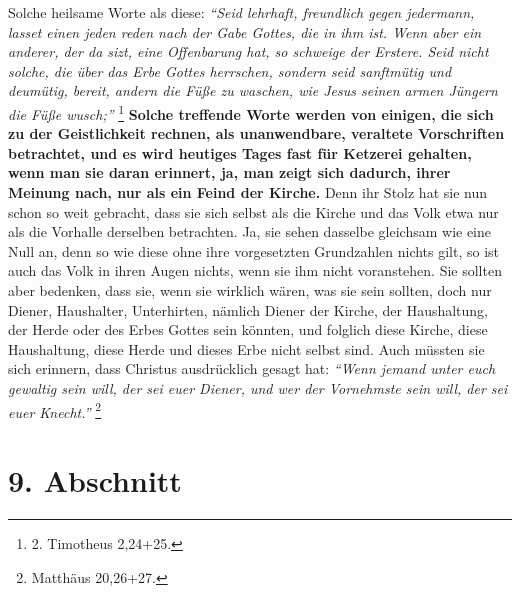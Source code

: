 Solche heilsame Worte als diese:
\textit{"`Seid lehrhaft, freundlich gegen jedermann,
lasset einen jeden reden nach der Gabe Gottes, die in ihm ist. Wenn aber ein
anderer, der da sizt, eine Offenbarung hat, so schweige der Erstere. Seid nicht
solche, die über das Erbe Gottes herrschen, sondern seid sanftmütig und
deumütig, bereit, andern die Füße zu waschen, wie Jesus seinen armen Jüngern die
Füße wusch;"'}
\footnote{2. Timotheus 2,24+25.}
\textbf{Solche treffende Worte werden von
einigen, die sich zu der Geistlichkeit rechnen, als
unanwendbare, veraltete
Vorschriften betrachtet, und es wird heutiges Tages fast für
Ketzerei gehalten,
wenn man sie daran erinnert, ja, man zeigt sich dadurch, ihrer Meinung nach, nur
als ein Feind der Kirche.} Denn ihr Stolz hat sie nun
schon so weit gebracht,
dass sie sich selbst als die Kirche und das Volk etwa nur als die Vorhalle
derselben betrachten. Ja, sie sehen dasselbe gleichsam wie eine Null an, denn so
wie diese ohne ihre vorgesetzten Grundzahlen nichts gilt, so ist auch das Volk in
ihren Augen nichts, wenn sie ihm nicht voranstehen. Sie sollten aber bedenken,
dass sie, wenn sie wirklich wären, was sie sein sollten, doch nur Diener,
Haushalter, Unterhirten, nämlich Diener der Kirche, der
Haushaltung, der Herde
oder des Erbes Gottes sein könnten, und folglich diese Kirche, diese
Haushaltung, diese Herde und dieses Erbe nicht selbst sind. Auch müssten sie
sich erinnern, dass Christus ausdrücklich gesagt hat:
\textit{"`Wenn jemand unter euch
gewaltig sein will, der sei euer Diener, und wer der Vornehmste sein will, der
sei euer Knecht."'}
\footnote{Matthäus 20,26+27.}

\section{9. Abschnitt} \label{kap12_ab9}

